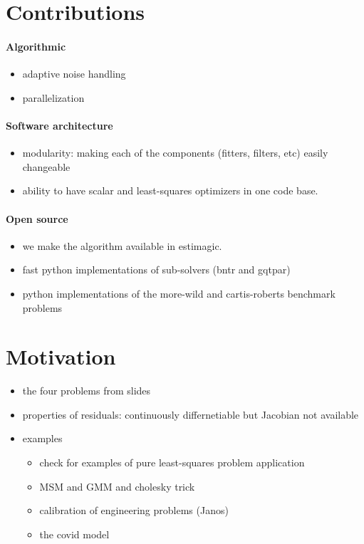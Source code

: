 \section{Contributions}
\paragraph{Algorithmic}
\begin{itemize}
    \item adaptive noise handling
    \item parallelization
\end{itemize}
\paragraph{Software architecture}
\begin{itemize}
    \item modularity: making each of the components (fitters, filters, etc) easily changeable
    \item ability to have scalar and least-squares optimizers in one code base.
\end{itemize}
\paragraph{Open source}
\begin{itemize}
    \item we make the algorithm available in estimagic.
    \item fast python implementations of sub-solvers (bntr and gqtpar)
    \item python implementations of the  more-wild and cartis-roberts benchmark problems
\end{itemize}

\section{Motivation}

\begin{itemize}
    \item the four problems from slides
    \item properties of residuals: continuously differnetiable but Jacobian not available
    \item examples
        \begin{itemize}
            \item check for examples of pure least-squares problem application
            \item MSM and GMM and cholesky trick
            \item calibration of engineering problems (Janos)
            \item the covid model
        \end{itemize}
\end{itemize}

